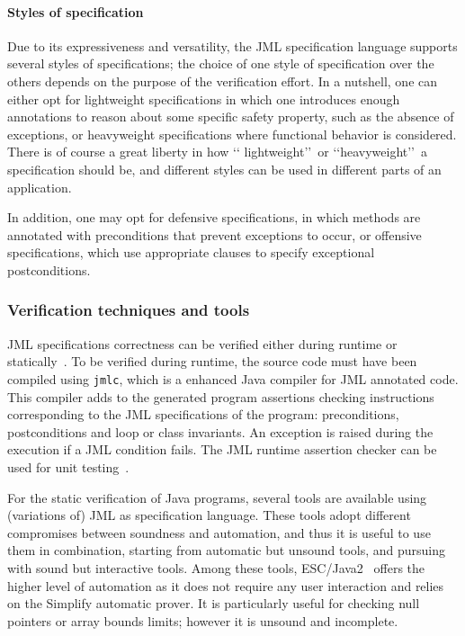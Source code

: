 \paragraph*{Styles of specification}
Due to its expressiveness and versatility, the JML specification
language supports several styles of specifications; the choice of one
style of specification over the others depends on the purpose of the
verification effort. In a nutshell, one can either opt for lightweight
specifications in which one introduces enough annotations to reason
about some specific safety property, such as the absence of
exceptions, or heavyweight specifications where functional behavior is
considered. There is of course a great liberty in how \lq\lq
lightweight\rq\rq\ or \lq\lq heavyweight\rq\rq\ a specification should
be, and different styles can be used in different parts of an
application.

In addition, one may opt for defensive specifications, in which methods
are annotated with preconditions that prevent exceptions to occur, or
offensive specifications, which use appropriate clauses to specify 
exceptional postconditions.

\subsubsection{Verification techniques and tools}

JML specifications correctness can be verified either during runtime
or statically~\cite{BurdyCCEKLLP03}. To be verified during runtime, the
source code must have been compiled using \texttt{jmlc}, which is a
enhanced Java compiler for JML annotated code. This compiler adds to
the generated program assertions checking instructions corresponding
to the JML specifications of the program: preconditions, postconditions 
and loop or class invariants. An exception is raised during the execution 
if a JML condition fails. The JML runtime assertion checker can be used
for unit testing~\cite{CL02:ecoop}.


For the static verification of Java programs, several tools are
available using (variations of) JML as specification language. These
tools adopt different compromises between soundness and automation,
and thus it is useful to use them in combination, starting from
automatic but unsound tools, and pursuing with sound but interactive
tools.  Among these tools, ESC/Java2~\cite{CK04:cassis} offers the higher
level of automation as it does not require any user interaction and
relies on the Simplify automatic prover. It is particularly useful for
checking null pointers or array bounds limits; however it is unsound
and incomplete.

